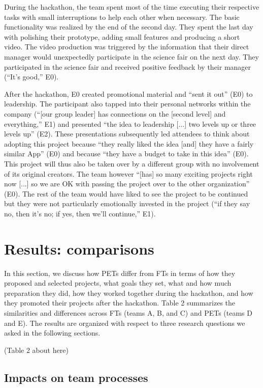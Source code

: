 \documentclass{hcij}
\begin{document}
During the hackathon, the team spent most of the time executing their respective tasks with small interruptions to help each other when necessary. The basic functionality was realized by the end of the second day. They spent the last day with polishing their prototype, adding small features and producing a short video. The video production was triggered by the information that their direct manager would unexpectedly participate in the science fair on the next day. They participated in the science fair and received positive feedback by their manager (“It’s good,” E0).

After the hackathon, E0 created promotional material and “sent it out” (E0) to leadership. The participant also tapped into their personal networks within the company (“[our group leader] has connections on the [second level] and everything,” E1) and presented “the idea to leadership [...] two levels up or three levels up” (E2). These presentations subsequently led attendees to think about adopting this project because “they really liked the idea [and] they have a fairly similar App” (E0) and because “they have a budget to take in this idea” (E0). This project will thus also be taken over by a different group with no involvement of its original creators. The team however “[has] so many exciting projects right now [...] so we are OK with passing the project over to the other organization” (E0). The rest of the team would have liked to see the project to be continued but they were not particularly emotionally invested in the project (“if they say no, then it’s no; if yes, then we’ll continue,” E1).

\section{Results: comparisons}
In this section, we discuss how PETs differ from FTs in terms of how they proposed and selected projects, what goals they set, what and how much preparation they did, how they worked together during the hackathon, and how they promoted their projects after the hackathon. Table 2 summarizes the similarities and differences across FTs (teams A, B, and C) and PETs (teams D and E). The results are organized with respect to three research questions we asked in the following sections.

(Table 2 about here)

\subsection{Impacts on team processes}
\end{document}

